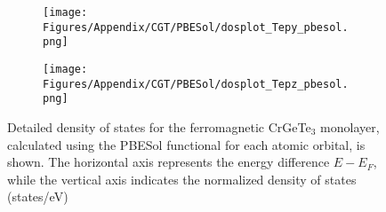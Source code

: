 \begin{figure}[H]
\begin{subfigure}{0.24\textwidth}
    \label{dosplot_Tepx_pbesol}
\end{subfigure}
\hfill
\begin{subfigure}{0.24\textwidth}
    \texttt{[image: Figures/Appendix/CGT/PBESol/dosplot\_Tepy\_pbesol.png]}
    \label{dosplot_Tepy_pbesol}
\end{subfigure}
\begin{subfigure}{0.24\textwidth}
    \texttt{[image: Figures/Appendix/CGT/PBESol/dosplot\_Tepz\_pbesol.png]}
    \label{dosplot_Tepz_pbesol}
\end{subfigure}
\hfill
     \caption{Detailed density of states for the ferromagnetic CrGeTe$_3$ monolayer, calculated using the PBESol functional for each atomic orbital, is shown. The horizontal axis represents the energy difference $E - E_F$, while the vertical axis indicates the normalized density of states (states/eV)}
     \label{CrPbesol}
 \end{figure}

